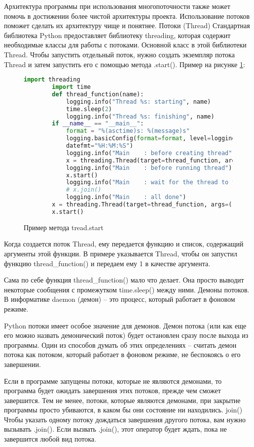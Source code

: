 Архитектура программы при использования многопоточности также может помочь в достижении более чистой архитектуры проекта. Использование потоков поможет сделать их архитектуру чище и понятнее.
Потоки (Thread)
Стандартная библиотека Python предоставляет библиотеку threading, которая содержит необходимые классы для работы с потоками. Основной класс в этой библиотеки Thread. Чтобы запустить отдельный поток, нужно создать экземпляр потока Thread и затем запустить его с помощью метода .start(). Пример на рисунке \ref{treading:image}:
\begin{figure}[H]
	\begin{lstlisting}[language=Python]
		import threading
		import time
		def thread_function(name):
			logging.info("Thread %s: starting", name)
			time.sleep(2)
			logging.info("Thread %s: finishing", name)
		if __name__ == "__main__":
			format = "%(asctime)s: %(message)s"
			logging.basicConfig(format=format, level=logging.INFO,
			datefmt="%H:%M:%S")
			logging.info("Main    : before creating thread")
			x = threading.Thread(target=thread_function, args=(1,))
			logging.info("Main    : before running thread")
			x.start()
			logging.info("Main    : wait for the thread to finish")
			# x.join()
			logging.info("Main    : all done")
		x = threading.Thread(target=thread_function, args=(1,))
		x.start()
	\end{lstlisting}  
	\caption{Пример метода tread.start}
	\label{treading:image}
\end{figure}
Когда создается поток Thread, ему передается функцию и список, содержащий аргументы этой функции. В примере указывается Thread, чтобы он запустил функцию thread\_function() и передаем ему 1 в качестве аргумента.

Сама по себе функция thread\_function() мало что делает. Она просто выводит некоторые сообщения с промежутком time.sleep() между ними.
Демоны потоков.
В информатике daemon (демон) – это процесс, который работает в фоновом режиме.

Python потоки имеет особое значение для демонов. Демон потока (или как еще его можно назвать демонический поток) будет остановлен сразу после выхода из программы. Один из способов думать об этих определениях – считать демон потока как потоком, который работает в фоновом режиме, не беспокоясь о его завершении.

Если в программе запущены потоки, которые не являются демонами, то программа будет ожидать завершения этих потоков, прежде чем сможет завершится. Тем не менее, потоки, которые являются демонами, при закрытие программы просто убиваются, в каком бы они состояние ни находились.
join()
Чтобы указать одному потоку дождаться завершения другого потока, вам нужно вызывать .join().  Если вызвать .join(), этот оператор будет ждать, пока не завершится любой вид потока.
